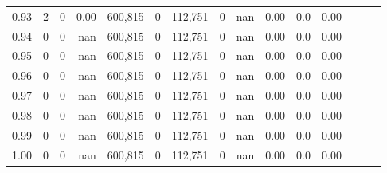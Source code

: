 \begin{tabular}{rrrrrrrrrrrrrrr}
0.93 &       2 &      0 &  0.00 &  600,815 &        0 &  112,751 &        0 &   nan &  0.00 &                     0.0 &      0.00 \\
0.94 &       0 &      0 &   nan &  600,815 &        0 &  112,751 &        0 &   nan &  0.00 &                     0.0 &      0.00 \\
0.95 &       0 &      0 &   nan &  600,815 &        0 &  112,751 &        0 &   nan &  0.00 &                     0.0 &      0.00 \\
0.96 &       0 &      0 &   nan &  600,815 &        0 &  112,751 &        0 &   nan &  0.00 &                     0.0 &      0.00 \\
0.97 &       0 &      0 &   nan &  600,815 &        0 &  112,751 &        0 &   nan &  0.00 &                     0.0 &      0.00 \\
0.98 &       0 &      0 &   nan &  600,815 &        0 &  112,751 &        0 &   nan &  0.00 &                     0.0 &      0.00 \\
0.99 &       0 &      0 &   nan &  600,815 &        0 &  112,751 &        0 &   nan &  0.00 &                     0.0 &      0.00 \\
1.00 &       0 &      0 &   nan &  600,815 &        0 &  112,751 &        0 &   nan &  0.00 &                     0.0 &      0.00 \\
\bottomrule
\end{tabular}

